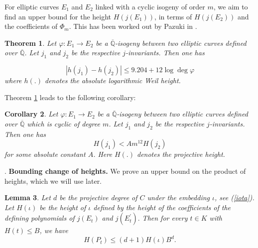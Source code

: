 \documentclass[12pt]{amsart}
\newtheorem{thm}{Theorem}[section]
\newtheorem{lem}[thm]{Lemma}
\newtheorem{cor}[thm]{Corollary}
\theoremstyle{definition}
\theoremstyle{remark}
\numberwithin{equation}{section}
\newcommand{\Q}{\mathbb{Q}}
\begin{document}
\vspace{1em}
For elliptic curves $E_{1}$ and $E_{2}$ linked with a cyclic isogeny of order $m$, we aim to find an upper bound for the height $H(j(E_{1}))$, in terms of $H(j(E_{2}))$ and the coefficients of $\Phi_{m}$. This has been worked out by Pazuki in \cite{Paz19}. 

\begin{thm}{\cite[Theorem 1.1]{Paz19}}\label{paz}
	Let $\varphi: E_{1} \rightarrow E_{2}$ be a $\overline{\mathbb{Q}}$-isogeny between two elliptic curves defined over $\overline{\mathbb{Q}}$. Let $j_{1}$ and $j_{2}$ be the respective $j$-invariants. Then one has
	
		$$\left\vert   h\left(j_{1}\right)-h\left(j_{2}\right)\right\vert    \leq 9.204+12 \log \operatorname{deg} \varphi$$ 
		where $h(.)$ denotes the absolute logarithmic Weil height.

		
		

\end{thm}

Theorem \ref{paz} leads to the following corollary:

\begin{cor}\label{pazc}
Let $\varphi: E_{1} \rightarrow E_{2}$ be a $\overline{\mathbb{Q}}$-isogeny between two elliptic curves defined over $\overline{\Q}$ which is cyclic of degree $m$. Let $j_{1}$ and $j_{2}$ be the respective $j$-invariants. Then one has
	$$H(j_{1}) < Am^{12}H(j_{2})$$
	for some absolute constant $A$. Here $H(.)$ denotes the projective height.
\end{cor}

\vspace{1em}
. \textbf{Bounding change of heights.} We prove an upper bound on the product of heights, which we will use later.

\begin{lem}\label{5.3}
Let $d$ be the projective degree of $C$ under the embedding $\iota$, see (\ref{iota}). Let $H(\iota)$ be the height of $\iota$ defined by the height of the coefficients of the defining polynomials of $j(E_{t})$ and $j(E_{t}^{\prime}).$ Then for every $t \in K$ with $H(t) \le B$, we have
$$H(P_{t}) \le (d+1)H(\iota)B^{d}.$$	
\end{lem}
\end{document}
